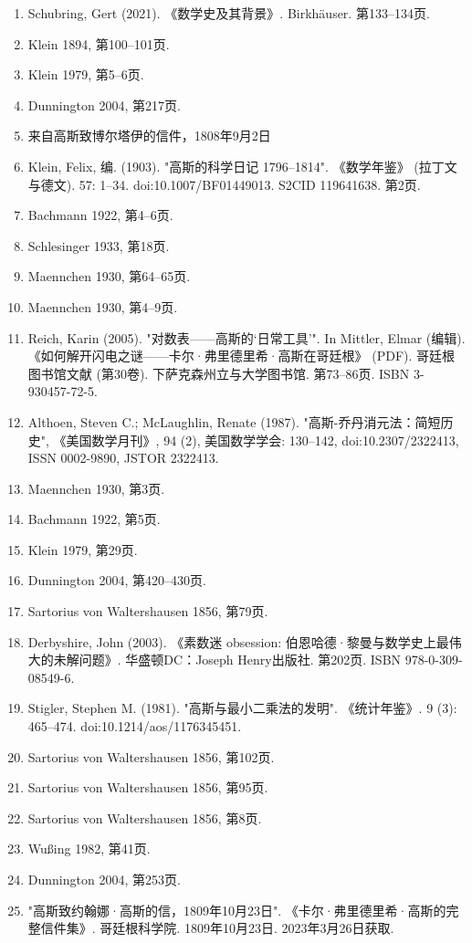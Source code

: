 \begin{enumerate}
\item Schubring, Gert (2021). 《数学史及其背景》. Birkhäuser. 第133–134页.  
\item Klein 1894, 第100–101页.  
\item Klein 1979, 第5–6页.  
\item Dunnington 2004, 第217页.  
\item 来自高斯致博尔塔伊的信件，1808年9月2日  
\item Klein, Felix, 编. (1903). "高斯的科学日记 1796–1814". 《数学年鉴》 (拉丁文与德文). 57: 1–34. doi:10.1007/BF01449013. S2CID 119641638. 第2页.  
\item Bachmann 1922, 第4–6页.  
\item Schlesinger 1933, 第18页.  
\item Maennchen 1930, 第64–65页.  
\item Maennchen 1930, 第4–9页.  
\item Reich, Karin (2005). "对数表——高斯的‘日常工具’". In Mittler, Elmar (编辑). 《如何解开闪电之谜——卡尔·弗里德里希·高斯在哥廷根》 (PDF). 哥廷根图书馆文献 (第30卷). 下萨克森州立与大学图书馆. 第73–86页. ISBN 3-930457-72-5.  
\item Althoen, Steven C.; McLaughlin, Renate (1987). "高斯-乔丹消元法：简短历史", 《美国数学月刊》, 94 (2), 美国数学学会: 130–142, doi:10.2307/2322413, ISSN 0002-9890, JSTOR 2322413.  
\item Maennchen 1930, 第3页.  
\item Bachmann 1922, 第5页.  
\item Klein 1979, 第29页.  
\item Dunnington 2004, 第420–430页.  
\item Sartorius von Waltershausen 1856, 第79页.  
\item Derbyshire, John (2003). 《素数迷 obsession: 伯恩哈德·黎曼与数学史上最伟大的未解问题》. 华盛顿DC：Joseph Henry出版社. 第202页. ISBN 978-0-309-08549-6.  
\item Stigler, Stephen M. (1981). "高斯与最小二乘法的发明". 《统计年鉴》. 9 (3): 465–474. doi:10.1214/aos/1176345451.  
\item Sartorius von Waltershausen 1856, 第102页.  
\item Sartorius von Waltershausen 1856, 第95页.  
\item Sartorius von Waltershausen 1856, 第8页.  
\item Wußing 1982, 第41页.  
\item Dunnington 2004, 第253页.  
\item "高斯致约翰娜·高斯的信，1809年10月23日". 《卡尔·弗里德里希·高斯的完整信件集》. 哥廷根科学院. 1809年10月23日. 2023年3月26日获取.  

\end{enumerate}
